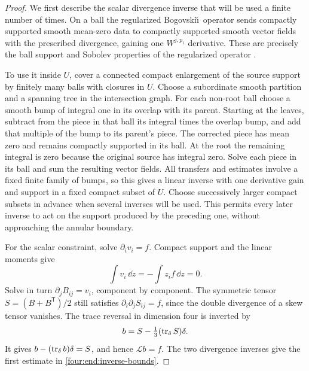 \begin{proof}
We first describe the scalar divergence inverse that will be used a
finite number of times. On a ball the regularized Bogovski\u\i\ operator
sends compactly supported smooth mean-zero data to compactly supported
smooth vector fields with the prescribed divergence, gaining one
\(W^{j,p_1}\) derivative. These are precisely the ball support and
Sobolev properties of the regularized operator
\cite{CostabelMcIntosh2010}.

To use it inside \(U\), cover a connected compact enlargement of the
source support by finitely many balls with closures in \(U\). Choose
a subordinate smooth partition and a spanning tree in the intersection
graph. For each non-root ball choose a smooth bump of integral one in
its overlap with its parent. Starting at the leaves, subtract from the
piece in that ball its integral times the overlap bump, and add that
multiple of the bump to its parent's piece. The corrected piece has
mean zero and remains compactly supported in its ball. At the root the
remaining integral is zero because the original source has integral
zero. Solve each piece in its ball and sum the resulting vector fields.
All transfers and estimates involve a fixed finite family of bumps,
so this gives a linear inverse with one derivative gain and support in
a fixed compact subset of \(U\). Choose successively larger compact
subsets in advance when several inverses will be used. This permits
every later inverse to act on the support produced by the preceding
one, without approaching the annular boundary.

For the scalar constraint, solve \(\partial_i v_i=f\). Compact support
and the linear moments give
\[
 \int v_i\,\dd z=-\int z_i f\,\dd z=0.
\]
Solve in turn \(\partial_jB_{ij}=v_i\), component by component.
The symmetric tensor \(S=(B+B^{\mathsf T})/2\) still satisfies
\(\partial_i\partial_jS_{ij}=f\), since the double divergence of a
skew tensor vanishes. The trace reversal in dimension four is inverted
by
\begin{equation}\label{four:end:trace-inverse}
 b=S-\tfrac13(\operatorname{tr}_\delta S)\delta.
\end{equation}
It gives \(b-(\operatorname{tr}_\delta b)\delta=S\), and hence \(\mathcal Lb=f\).
The two divergence inverses give the first estimate in
\eqref{four:end:inverse-bounds}.


\end{proof}
